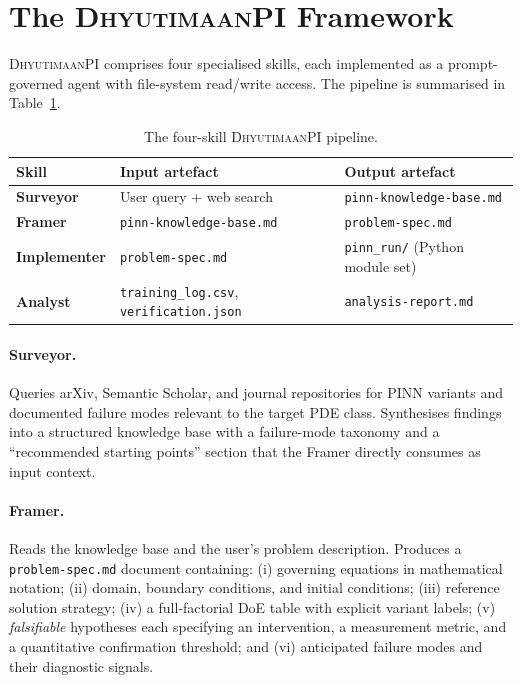 \documentclass{article}
\newcommand{\dhyutimaan}{\textsc{DhyutimaanPI}}
\begin{document}
\section{The \dhyutimaan{} Framework}
\label{sec:framework}

\dhyutimaan{} comprises four specialised skills, each implemented as a
prompt-governed agent with file-system read/write access.
The pipeline is summarised in Table~\ref{tab:pipeline}.

\begin{table}[h]
\centering
\caption{The four-skill \dhyutimaan{} pipeline.}
\label{tab:pipeline}
\small
\begin{tabular}{llp{5.5cm}}
\toprule
Skill & Input artefact & Output artefact \\
\midrule
\textbf{Surveyor}     & User query + web search
                      & \texttt{pinn-knowledge-base.md} \\
\textbf{Framer}       & \texttt{pinn-knowledge-base.md}
                      & \texttt{problem-spec.md} \\
\textbf{Implementer}  & \texttt{problem-spec.md}
                      & \texttt{pinn\_run/} (Python module set) \\
\textbf{Analyst}      & \texttt{training\_log.csv},
                        \texttt{verification.json}
                      & \texttt{analysis-report.md} \\
\bottomrule
\end{tabular}
\end{table}

\paragraph{Surveyor.}
Queries arXiv, Semantic Scholar, and journal repositories for PINN variants
and documented failure modes relevant to the target PDE class.
Synthesises findings into a structured knowledge base with a failure-mode
taxonomy and a ``recommended starting points'' section that the Framer
directly consumes as input context.

\paragraph{Framer.}
Reads the knowledge base and the user's problem description.
Produces a \texttt{problem-spec.md} document containing: (i) governing
equations in mathematical notation; (ii) domain, boundary conditions, and
initial conditions; (iii) reference solution strategy; (iv) a full-factorial
DoE table with explicit variant labels; (v) \emph{falsifiable} hypotheses
each specifying an intervention, a measurement metric, and a quantitative
confirmation threshold; and (vi) anticipated failure modes and their
diagnostic signals.
\end{document}
